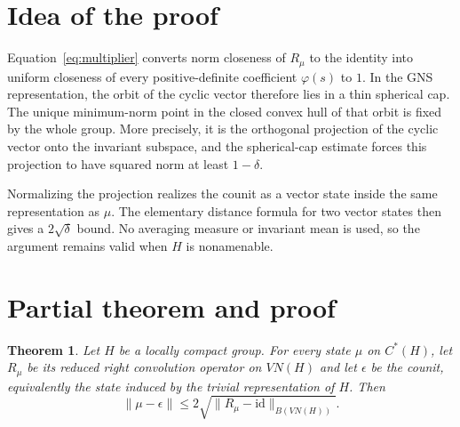 \documentclass[11pt]{article}
\newtheorem{theorem}{Theorem}
\newcommand{\id}{\mathrm{id}}
\begin{document}
\section{Idea of the proof}

Equation~\eqref{eq:multiplier} converts norm closeness of $R_\mu$ to the
identity into uniform closeness of every positive-definite coefficient
$\varphi(s)$ to $1$. In the GNS representation, the orbit of the cyclic
vector therefore lies in a thin spherical cap. The unique minimum-norm point
in the closed convex hull of that orbit is fixed by the whole group. More
precisely, it is the orthogonal projection of the cyclic vector onto the
invariant subspace, and the spherical-cap estimate forces this projection to
have squared norm at least $1-\delta$.

Normalizing the projection realizes the counit as a vector state inside the
same representation as $\mu$. The elementary distance formula for two vector
states then gives a $2\sqrt\delta$ bound. No averaging measure or invariant
mean is used, so the argument remains valid when $H$ is nonamenable.

\section{Partial theorem and proof}

\begin{theorem}\label{thm:main}
Let $H$ be a locally compact group. For every state $\mu$ on $C^*(H)$, let
$R_\mu$ be its reduced right convolution operator on $VN(H)$ and let
$\epsilon$ be the counit, equivalently the state induced by the trivial
representation of $H$. Then
\begin{equation}\label{eq:mainbound}
  \|\mu-\epsilon\|
  \le 2\sqrt{\|R_\mu-\id\|_{B(VN(H))}}.
\end{equation}
\end{theorem}
\end{document}

